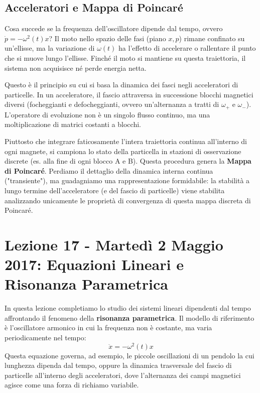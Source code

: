 \documentclass[12pt,a4paper]{article}
\begin{document}
\subsection{Acceleratori e Mappa di Poincaré}
Cosa succede se la frequenza dell'oscillatore dipende dal tempo, ovvero $\dot{p} = -\omega^2(t)x$? Il moto nello spazio delle fasi (piano $x, p$) rimane confinato su un'ellisse, ma la variazione di $\omega(t)$ ha l'effetto di accelerare o rallentare il punto che si muove lungo l'ellisse. Finché il moto si mantiene su questa traiettoria, il sistema non acquisisce né perde energia netta.

Questo è il principio su cui si basa la dinamica dei fasci negli acceleratori di particelle. In un acceleratore, il fascio attraversa in successione blocchi magnetici diversi (focheggianti e defocheggianti, ovvero un'alternanza a tratti di $\omega_+$ e $\omega_-$). L'operatore di evoluzione non è un singolo flusso continuo, ma una moltiplicazione di matrici costanti a blocchi.

Piuttosto che integrare faticosamente l'intera traiettoria continua all'interno di ogni magnete, si campiona lo stato della particella in stazioni di osservazione discrete (es. alla fine di ogni blocco A e B). Questa procedura genera la \textbf{Mappa di Poincaré}. 
Perdiamo il dettaglio della dinamica interna continua ("transiente"), ma guadagniamo una rappresentazione formidabile: la stabilità a lungo termine dell'acceleratore (e del fascio di particelle) viene stabilita analizzando unicamente le proprietà di convergenza di questa mappa discreta di Poincaré.

\newpage
\section{Lezione 17 - Martedì 2 Maggio 2017: Equazioni Lineari e Risonanza Parametrica}

In questa lezione completiamo lo studio dei sistemi lineari dipendenti dal tempo affrontando il fenomeno della \textbf{risonanza parametrica}. Il modello di riferimento è l'oscillatore armonico in cui la frequenza non è costante, ma varia periodicamente nel tempo:
\begin{equation}
\ddot{x} = -\omega^2(t)x
\end{equation}
Questa equazione governa, ad esempio, le piccole oscillazioni di un pendolo la cui lunghezza dipenda dal tempo, oppure la dinamica trasversale del fascio di particelle all'interno degli acceleratori, dove l'alternanza dei campi magnetici agisce come una forza di richiamo variabile.
\end{document}
